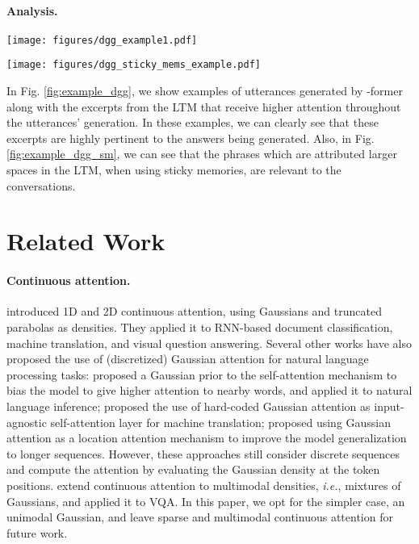 \documentclass[11pt]{article}
\begin{document}
\paragraph{Analysis. } 
\begin{figure*}[t]
  \centering
    \texttt{[image: figures/dgg\_example1.pdf]}
  \caption{Examples of answers generated by \mbox{-former} on a dialogue about the movie ``Home Alone''. The excerpts from the LTM that are more attended to throughout the utterances generation are highlighted on each color, correspondingly.}
  \label{fig:example_dgg}
\end{figure*}
\begin{figure*}[t]
  \centering
    \texttt{[image: figures/dgg\_sticky\_mems\_example.pdf]}
  \caption{Phrases that hold larger spaces of the LTM, when using sticky memories, for two dialogue examples (in App. \ref{sec:examples}).}
  \label{fig:example_dgg_sm}
\end{figure*}
In Fig. \ref{fig:example_dgg}, we show examples of utterances generated by \mbox{-former} along with the excerpts from the LTM that receive higher attention throughout the utterances' generation. In these examples, we can clearly see that these excerpts are highly pertinent to the answers being generated. Also, in Fig. \ref{fig:example_dgg_sm}, we can see that the phrases which are attributed larger spaces in the LTM, when using sticky memories, are relevant to the conversations. 


\section{Related Work}
\paragraph{Continuous attention. }
\citet{martins2020sparse} introduced 1D and 2D continuous attention, using Gaussians and truncated parabolas as densities. They applied it to RNN-based document classification, machine translation, and visual question answering.
Several other works have also proposed the use of (discretized) Gaussian attention for natural language processing tasks: \citet{guo2019gaussian} proposed a Gaussian prior to the self-attention mechanism to bias the model to give higher attention to nearby words, and applied it to natural language inference;
\citet{you2020hard} proposed the use of hard-coded Gaussian attention as input-agnostic self-attention layer for machine translation; \citet{dubois2020location} proposed using Gaussian attention as a location attention mechanism to improve the model generalization to longer sequences. However, these approaches still consider discrete sequences and compute the attention by evaluating the Gaussian density at the token positions. 
\citet{Farinhas2021MultimodalCV} extend continuous attention to multimodal densities, \textit{i.e.}, mixtures of Gaussians, and applied it to VQA. In this paper, we opt for the simpler case, an unimodal Gaussian, and leave sparse and multimodal continuous attention for future work. 
\end{document}

